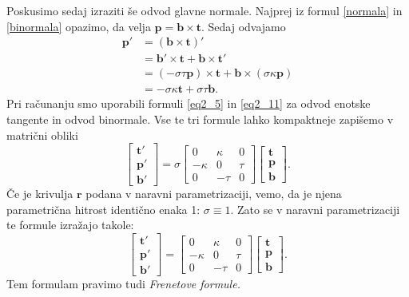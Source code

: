 \documentclass[12pt,a4paper,twoside]{article}
\theoremstyle{definition} %
\theoremstyle{plain} %
\theoremstyle{primerstyle}
\numberwithin{equation}{section}  %
\newcommand{\tV}{\mathbf{t}}
\newcommand{\bV}{\mathbf{b}}
\newcommand{\pV}{\mathbf{p}}
\newcommand{\rV}{\mathbf{r}}
\begin{document}
Poskusimo sedaj izraziti še odvod glavne normale. Najprej iz formul \eqref{normala} in \eqref{binormala} opazimo, da velja $\pV=\bV\times\tV.$ Sedaj odvajamo
\begin{align*}
	\pV'&=(\bV\times\tV)'\\
	&=\bV'\times\tV+\bV\times\tV'\\
	&=(-\sigma\tau\pV)\times\tV+\bV\times(\sigma\kappa\pV)\\
	&=-\sigma\kappa\tV+\sigma\tau\bV.
\end{align*}
Pri računanju smo uporabili formuli \eqref{eq2_5} in \eqref{eq2_11} za odvod enotske tangente in odvod binormale. Vse te tri formule lahko kompaktneje zapišemo v matrični obliki
\begin{equation}
	\label{frenetove_formule}
	\begin{bmatrix}
		\tV'\\
		\pV'\\
		\bV'
	\end{bmatrix}=
	\sigma
	\begin{bmatrix}
		0&\kappa&0\\
		-\kappa&0&\tau\\
		0&-\tau&0
	\end{bmatrix}
	\begin{bmatrix}
		\tV\\
		\pV\\
		\bV
	\end{bmatrix}\!.
\end{equation}
Če je krivulja $\rV$ podana v naravni parametrizaciji, vemo, da je njena parametrična hitrost identično enaka 1: $\sigma\equiv 1.$ Zato se v naravni parametrizaciji te formule izražajo takole:
\begin{equation}
	\label{naravne_frenetove_formule}
	\begin{bmatrix}
		\tV'\\
		\pV'\\
		\bV'
	\end{bmatrix}=
	\begin{bmatrix}
		0&\kappa&0\\
		-\kappa&0&\tau\\
		0&-\tau&0
	\end{bmatrix}
	\begin{bmatrix}
		\tV\\
		\pV\\
		\bV
	\end{bmatrix}\!.
\end{equation}
Tem formulam pravimo tudi \emph{Frenetove formule.}
\end{document}
